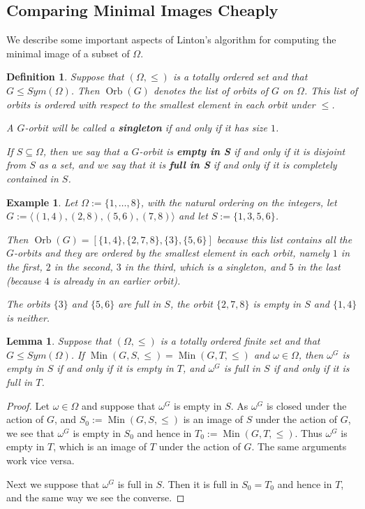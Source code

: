 \documentclass[preprint,12pt]{elsarticle}
\newtheorem{lem}[theorem]{Lemma}
\newtheorem{defi}[theorem]{Definition}
\newtheorem{ex}[theorem]{Example}
\newcommand{\Sym}[1]{\ensuremath{Sym(#1)}}
\newcommand{\Min}{\operatorname{Min}}
\newcommand{\Orb}{\operatorname{Orb}}
\begin{document}
\subsection{Comparing Minimal Images Cheaply}

We describe some important aspects of Linton's
algorithm for computing the minimal image of a subset of $\Omega$.
\begin{defi}

Suppose that $(\Omega, \le)$ is a totally ordered set and that $G \le
\Sym{\Omega}$. Then \(\Orb(G)\) denotes the list of orbits of $G$ on $\Omega$.
This list of orbits is ordered with respect to the smallest element in each orbit under $\le$.

A $G$-orbit will be called a \textbf{singleton} if and only if it has size $1$.

If \(S \subseteq \Omega\), then we say that a $G$-orbit is \textbf{empty in S}
if and only if it is disjoint from $S$ as a set, and we say that it is
\textbf{full in S} if and only if it is completely contained in $S$.
\end{defi}

\begin{ex}
  Let \(\Omega:=\{1,\dots,8\}\), with the natural ordering on the integers, let
  \(G := \langle (1,4), (2,8), (5,6), (7,8) \rangle\) and let $S:=\{1,3,5,6\}$.

  Then \(\Orb(G) = [ \{1,4\}, \{2,7,8\}, \{3\}, \{5,6\} ]\) because this list
  contains all the $G$-orbits and they are ordered by the smallest element in each
  orbit, namely $1$ in the first, $2$ in the second, $3$ in the third, which is a
  singleton, and $5$ in the last (because $4$ is already in an earlier orbit).

  The orbits $\{3\}$ and $\{5,6\}$ are full in $S$, the orbit $\{2,7,8\}$ is
  empty in $S$ and $\{1,4\}$ is neither.
\end{ex}


\begin{lem}\label{same}
Suppose that $(\Omega, \le)$ is a totally ordered finite set and that $G \le
\Sym{\Omega}$. If
$\Min(G,S,\le)=\Min(G,T,\le)$ and $\omega \in \Omega$, then $\omega^G$ is empty in $S$ if
and only if it is empty in $T$, and $\omega^G$ is full in $S$ if and only if it is
full in $T$.
\end{lem}

\begin{proof}
  Let $\omega \in \Omega$ and suppose that $\omega^G$ is empty in $S$. As $\omega^G$
  is closed under the action of $G$, and $S_0 := \Min(G,S,\le)$ is an image
  of $S$ under the action of $G$, we see that $\omega^G$ is empty in $S_0$ and hence
  in $T_0:=\Min(G,T,\le)$. Thus $\omega^G$ is empty in $T$, which is an image of $T$
  under the action of $G$. The same arguments work vice versa.

  Next we suppose that $\omega^G$ is full in $S$. Then it is full in $S_0=T_0$ and
  hence in $T$, and the same way we see the converse.
\end{proof}
\end{document}
